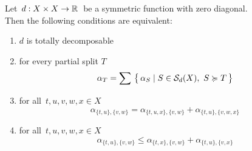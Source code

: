 \documentclass[./main.tex]{subfiles}
\begin{document}
\begin{theorem}[{\cites[Theorem 6]{BD92a}}] \label{teo:teo6}
    Let $\, d : {X \times X} \to \mathbb{R} \,$ be a symmetric function with zero diagonal. \\
    Then the following conditions are equivalent:
    \begin{enumerate}[label=(\roman*)]
        \item $d$ is totally decomposable
        \item for every partial split $T$
            \[ \alpha_T = \sum\ \bigl\{\, \alpha_S \mid S \in {\mathcal{S}}_d(X),\ S \succcurlyeq T \,\bigr\} \]
        \item for all $\, t,u,v,w,x \in X \,$
            \[ \alpha_{\{t,u\},\{v,w\}} = \alpha_{\{t,u,x\},\{v,w\}} + \alpha_{\{t,u\},\{v,w,x\}} \]
        \item for all $\, t,u,v,w,x \in X \,$
            \[ \alpha_{\{t,u\},\{v,w\}} \leq \alpha_{\{t,x\},\{v,w\}} + \alpha_{\{t,u\},\{v,x\}} \]
    \end{enumerate}
\end{theorem}
\end{document}
